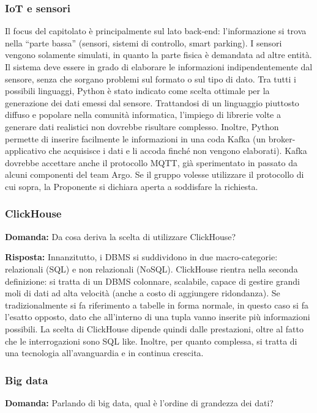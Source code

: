\subsubsection{IoT e sensori}
Il focus del capitolato è principalmente sul lato back-end: l’informazione si trova nella “parte bassa” (sensori, sistemi di controllo, smart parking). I sensori vengono solamente simulati, in quanto la parte fisica è demandata ad altre entità. Il sistema deve essere in grado di elaborare le informazioni indipendentemente dal sensore, senza che sorgano problemi sul formato o sul tipo di dato. Tra tutti i possibili linguaggi, Python è stato indicato come scelta ottimale per la generazione dei dati emessi dal sensore. Trattandosi di un linguaggio piuttosto diffuso e popolare nella comunità informatica, l’impiego di librerie volte a generare dati realistici non dovrebbe risultare complesso. 
Inoltre, Python permette di inserire facilmente le informazioni in una coda Kafka (un broker-applicativo che acquisisce i dati e li accoda finché non vengono elaborati). Kafka dovrebbe accettare anche il protocollo MQTT, già sperimentato in passato da alcuni componenti del team Argo. Se il gruppo volesse utilizzare il protocollo di cui sopra, la Proponente si dichiara aperta a soddisfare la richiesta.

\subsubsection{ClickHouse}
\textbf{Domanda:} Da cosa deriva la scelta di utilizzare ClickHouse?

\textbf{Risposta:} Innanzitutto, i DBMS si suddividono in due macro-categorie: relazionali (SQL) e non relazionali (NoSQL). ClickHouse rientra nella seconda definizione: si tratta di un DBMS colonnare, scalabile, capace di gestire grandi moli di dati ad alta velocità (anche a costo di aggiungere ridondanza). Se tradizionalmente si fa riferimento a tabelle in forma normale, in questo caso si fa l’esatto opposto, dato che all’interno di una tupla vanno inserite più informazioni possibili. La scelta di ClickHouse dipende quindi dalle prestazioni, oltre al fatto che le interrogazioni sono SQL like. Inoltre, per quanto complessa, si tratta di una tecnologia all’avanguardia e in continua crescita.

\subsubsection{Big data}
\textbf{Domanda:} Parlando di big data, qual è l’ordine di grandezza dei dati?

